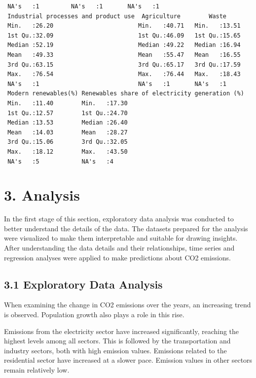 \documentclass[
  letterpaper,
  DIV=11,
  numbers=noendperiod]{scrartcl}
\begin{document}
\begin{verbatim}
 NA's   :1         NA's   :1       NA's   :1      
 Industrial processes and product use  Agriculture        Waste      
 Min.   :26.20                        Min.   :40.71   Min.   :13.51  
 1st Qu.:32.09                        1st Qu.:46.09   1st Qu.:15.65  
 Median :52.19                        Median :49.22   Median :16.94  
 Mean   :49.33                        Mean   :55.47   Mean   :16.55  
 3rd Qu.:63.15                        3rd Qu.:65.17   3rd Qu.:17.59  
 Max.   :76.54                        Max.   :76.44   Max.   :18.43  
 NA's   :1                            NA's   :1       NA's   :1      
 Modern renewables(%) Renewables share of electricity generation (%)
 Min.   :11.40        Min.   :17.30                                 
 1st Qu.:12.57        1st Qu.:24.70                                 
 Median :13.53        Median :26.40                                 
 Mean   :14.03        Mean   :28.27                                 
 3rd Qu.:15.06        3rd Qu.:32.05                                 
 Max.   :18.12        Max.   :43.50                                 
 NA's   :5            NA's   :4                                     
\end{verbatim}

\section{3. Analysis}\label{analysis}

In the first stage of this section, exploratory data analysis was
conducted to better understand the details of the data. The datasets
prepared for the analysis were visualized to make them interpretable and
suitable for drawing insights. After understanding the data details and
their relationships, time series and regression analyses were applied to
make predictions about CO2 emissions.

\subsection{3.1 Exploratory Data
Analysis}\label{exploratory-data-analysis}

When examining the change in CO2 emissions over the years, an increasing
trend is observed. Population growth also plays a role in this rise.

Emissions from the electricity sector have increased significantly,
reaching the highest levels among all sectors. This is followed by the
transportation and industry sectors, both with high emission values.
Emissions related to the residential sector have increased at a slower
pace. Emission values in other sectors remain relatively low.
\end{document}
